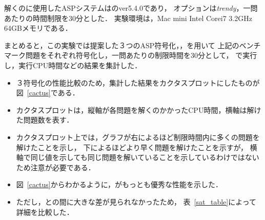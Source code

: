 解くのに使用したASPシステムは{\clingo}のver5.4.0であり，
オプションは\textit{trendy}，一問あたりの時間制限を30分とした．
実験環境は，Mac mini Intel Corei7 3.2GHz 64GBメモリである．

まとめると，この実験では提案した３つのASP符号化，，を用いて
上記のベンチマーク問題をそれぞれ符号化し，一問あたりの制限時間を30分として，
{\clingo}で実行し，実行CPU時間などの結果を集計した．

\begin{itemize}
\item ３符号化の性能比較のため，集計した結果をカクタスプロットにしたものが図~\ref{cactus}である．
\item カクタスプロットは，縦軸が各問題を解くのかかったCPU時間，横軸は解けた問題数を表す．
\item カクタスプロット上では，グラフが右によるほど制限時間内に多くの問題を解けたことを示し，
  下によるほどより早く問題を解けたことを示すが，
  横軸で同じ値を示しても同じ問題を解いていることを示しているわけではないため注意が必要である．
\item 図~\ref{cactus}からわかるように，がもっとも優秀な性能を示した．
\item ただし，との間に大きな差が見られなかったため，
  表~\ref{sat_table}によって詳細を比較した．
\end{itemize}

